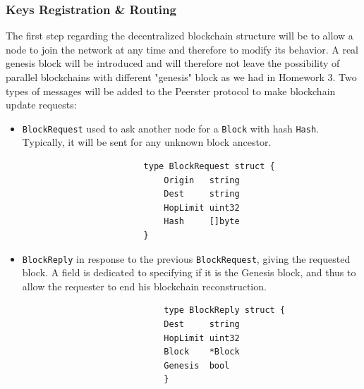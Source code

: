 \documentclass[11pt, a4paper]{article}
\begin{document}

        \subsubsection{Keys Registration \& Routing}

            The first step regarding the decentralized blockchain structure will be to allow a node to join the network at any time and therefore to modify its behavior.
            A real genesis block will be introduced and will therefore not leave the possibility of parallel blockchains with different "genesis" block as we had in Homework 3.
            \bigbreak
            Two types of messages will be added to the Peerster protocol to make blockchain update requests:
            \begin{itemize}
                \item \texttt{BlockRequest} used to ask another node for a \texttt{Block} with hash \texttt{Hash}. Typically, it will be sent for any unknown block ancestor.
                    \begin{lstlisting}
                        type BlockRequest struct {
                            Origin   string
                            Dest     string
                            HopLimit uint32
                            Hash     []byte
                        }
                    \end{lstlisting}

                \item \texttt{BlockReply} in response to the previous \texttt{BlockRequest}, giving the requested block.
                A field is dedicated to specifying if it is the Genesis block, and thus to allow the requester to end his blockchain reconstruction.
                        \begin{lstlisting}
                            type BlockReply struct {
                            Dest     string
                            HopLimit uint32
                            Block    *Block
                            Genesis  bool
                            }
                        \end{lstlisting}
            \end{itemize}
\end{document}
